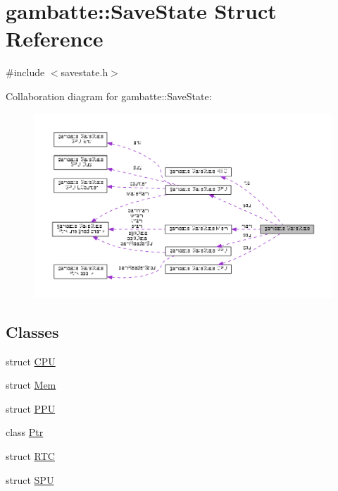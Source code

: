 \hypertarget{structgambatte_1_1SaveState}{}\section{gambatte\+:\+:Save\+State Struct Reference}
\label{structgambatte_1_1SaveState}


{\ttfamily \#include $<$savestate.\+h$>$}



Collaboration diagram for gambatte\+:\+:Save\+State\+:\nopagebreak
\begin{figure}[H]
\begin{center}
\leavevmode
\includegraphics[width=350pt]{structgambatte_1_1SaveState__coll__graph}
\end{center}
\end{figure}
\subsection*{Classes}
\begin{DoxyCompactItemize}
\item 
struct \hyperlink{structgambatte_1_1SaveState_1_1CPU}{C\+PU}
\item 
struct \hyperlink{structgambatte_1_1SaveState_1_1Mem}{Mem}
\item 
struct \hyperlink{structgambatte_1_1SaveState_1_1PPU}{P\+PU}
\item 
class \hyperlink{classgambatte_1_1SaveState_1_1Ptr}{Ptr}
\item 
struct \hyperlink{structgambatte_1_1SaveState_1_1RTC}{R\+TC}
\item 
struct \hyperlink{structgambatte_1_1SaveState_1_1SPU}{S\+PU}
\end{DoxyCompactItemize}
